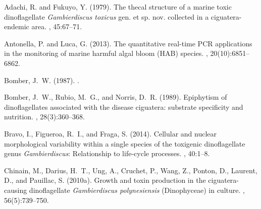 \documentclass[10pt,letterpaper]{article}
\begin{document}
%
%
% 
\begin{thebibliography}{10}
Adachi, R. and Fukuyo, Y. (1979).
\newblock The thecal structure of a marine toxic dinoflagellate
  \emph{Gambierdiscus toxicus} gen. et sp. nov. collected in a
  ciguatera-endemic area.
, 45:67--71.

Antonella, P. and Luca, G. (2013).
\newblock The quantitative real-time {PCR} applications in the monitoring of
  marine harmful algal bloom ({HAB}) species.
,
  20(10):6851--6862.

Bomber, J.~W. (1987).
.

Bomber, J.~W., Rubio, M.~G., and Norris, D.~R. (1989).
\newblock Epiphytism of dinoflagellates associated with the disease ciguatera:
  substrate specificity and nutrition.
, 28(3):360--368.

Bravo, I., Figueroa, R.~I., and Fraga, S. (2014).
\newblock Cellular and nuclear morphological variability within a single
  species of the toxigenic dinoflagellate genus \emph{Gambierdiscus}:
  {R}elationship to life-cycle processes.
, 40:1--8.

Chinain, M., Darius, H.~T., Ung, A., Cruchet, P., Wang, Z., Ponton, D.,
  Laurent, D., and Pauillac, S. (2010a).
\newblock Growth and toxin production in the ciguatera-causing dinoflagellate
  \emph{Gambierdiscus polynesiensis} ({D}inophyceae) in culture.
, 56(5):739--750.


\end{thebibliography}
\end{document}
